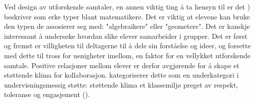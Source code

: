 \documentclass[12pt,twoside,onecolumn,norsk]{article}
\begin{document}
Ved design av utforskende samtaler, en annen viktig ting å ta hensyn til er det 
) beskriver som erke typer blant matematikere. Det er 
viktig at elevene kan bruke
den typen de assosierer seg med: "algebraikere" eller "geometere". Det er kanskje 
interessant å undersøke hvordan slike elever samarbeider i grupper.
\newline
\newline
Det er først og fremst er villigheten til deltagerne til å dele sin forståelse og 
ideer, og forsette med dette til tross for uenigheter imellom, en faktor for en 
vellykket utforskende samtale. Positive relasjoner mellom elever er derfor 
avgjørende for å skape et støttende klima for kollaborasjon.  
kategoriserer dette som en underkategori i undervisningsmessig støtte: støttende 
klima et klassemiljø preget av respekt, toleranse og engasjement 
().



\end{document}
